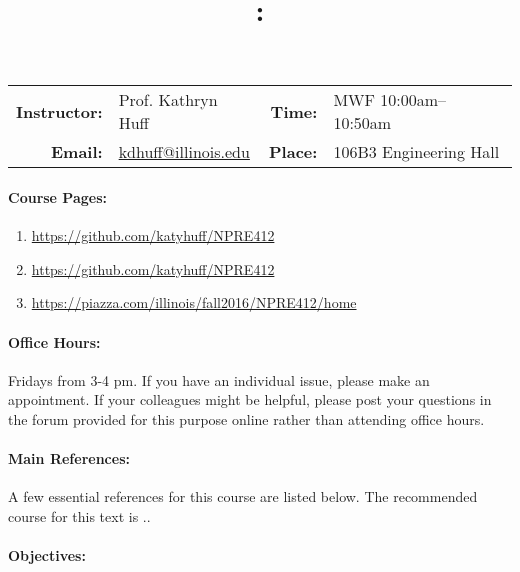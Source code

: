 \documentclass[11pt, a4paper]{article}
\title{\CourseNumber: \CourseTitle\\}
\author{\CourseUniversity}
\date{\CourseSemester \CourseYear}
\makeatletter
\newcommand{\CourseNumber}{NPRE412}
\newcommand{\CourseInstructor}{Prof. Kathryn Huff\xspace}%
\newcommand{\CourseDays}{MWF\xspace}%
\newcommand{\CourseStart}{10:00am\xspace}%
\newcommand{\CourseEnd}{10:50am\xspace}%
\newcommand{\CourseInstructorEmail}{kdhuff@illinois.edu}
\newcommand{\CourseRoom}{106B3\xspace}%
\newcommand{\CourseBuilding}{Engineering Hall\xspace}%
\makeatother
\begin{document}
\maketitle
\renewcommand{\arraystretch}{2}
\begin{center}
\begin{table}[h]
\begin{tabularx}{\textwidth}{rXrX}
\hline
\textbf{Instructor:} & \CourseInstructor & \textbf{Time:} & \CourseDays \CourseStart -- \CourseEnd \\
\textbf{Email:} &  \href{mailto:\CourseInstructorEmail}{\CourseInstructorEmail} & \textbf{Place:} & \CourseRoom \CourseBuilding\\
\hline
\end{tabularx}
\end{table}
\end{center}

\paragraph{Course Pages:}
\begin{enumerate}
\item \url{https://github.com/katyhuff/\CourseNumber}
\item \url{https://github.com/katyhuff/\CourseNumber}
\item \url{https://piazza.com/illinois/fall2016/\CourseNumber/home}
\end{enumerate}

\paragraph{Office Hours:} Fridays from 3-4 pm. If you have an individual issue, 
please make an appointment. If your colleagues might be helpful, please post your 
questions in the forum provided for this purpose online rather than attending 
office hours.

\paragraph{Main References:}
A few essential references for this course are listed below. The recommended 
course for this text is \cite{tsoulfanidis_nuclear_2013}..
\nocite{*}

\renewcommand{\refname}{\normalfont\selectfont\normalsize}\vspace{-1cm} 


\paragraph{Objectives:} 
\end{document}
